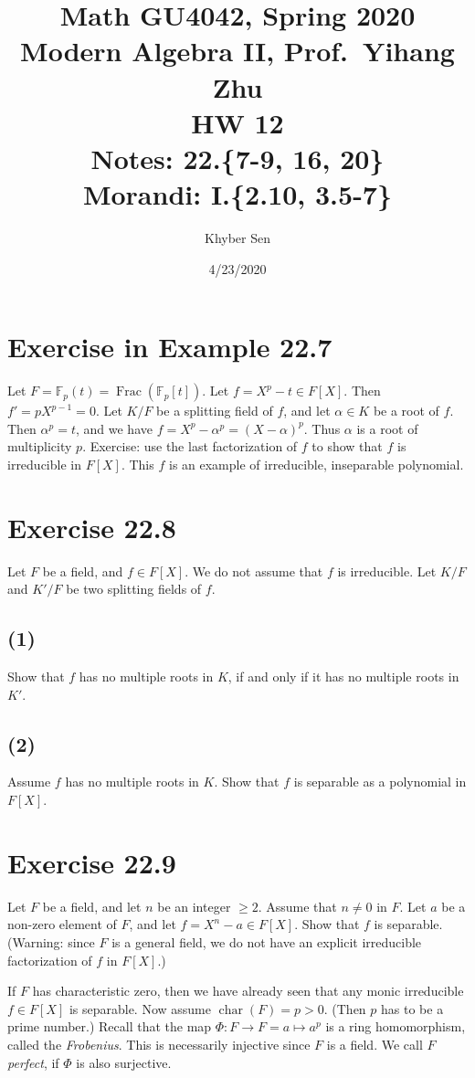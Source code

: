 \documentclass[fleqn]{article}
\title{
Math GU4042, Spring 2020 \\
Modern Algebra II, Prof.\ Yihang Zhu \\
HW 12 \\
Notes: 22.\{7-9, 16, 20\} \\
Morandi: I.\{2.10, 3.5-7\} \\
}
\author{Khyber Sen}
\date{4/23/2020}
\DeclareMathOperator{\Char}{char}
\DeclareMathOperator{\Frac}{Frac}
\begin{document}
    
    \maketitle
    
    \section{Exercise in Example 22.7}
    Let $F = \mathbb{F}_p(t) = \Frac\left(\mathbb{F}_p[t]\right)$.  Let $f = X^p - t \in F[X]$.  Then $f' = pX^{p - 1} = 0$.  Let $K/F$ be a splitting field of $f$, and let $\alpha \in K$ be a root of $f$.  Then $\alpha^p = t$, and we have $f = X^p - \alpha^p = (X - \alpha)^p$.  Thus $\alpha$ is a root of multiplicity $p$.  Exercise: use the last factorization of $f$ to show that $f$ is irreducible in $F[X]$.  This $f$ is an example of irreducible, inseparable polynomial.
    
    \section{Exercise 22.8}
    Let $F$ be a field, and $f \in F[X]$.  We do not assume that $f$ is irreducible.  Let $K/F$ and $K'/F$ be two splitting fields of $f$.
        
        \subsection{(1)}
        Show that $f$ has no multiple roots in $K$, if and only if it has no multiple roots in $K'$.
        
        \subsection{(2)}
        Assume $f$ has no multiple roots in $K$.  Show that $f$ is separable as a polynomial in $F[X]$.
    
    \section{Exercise 22.9}
    Let $F$ be a field, and let $n$ be an integer $\geq 2$.  Assume that $n \neq 0$ in $F$.  Let $a$ be a non-zero element of $F$, and let $f = X^n - a \in F[X]$.  Show that $f$ is separable.  (Warning: since $F$ is a general field, we do not have an explicit irreducible factorization of $f$ in $F[X]$.)
    
    If $F$ has characteristic zero, then we have already seen that any monic irreducible $f \in F[X]$ is separable.  Now assume $\Char(F) = p > 0$.  (Then $p$ has to be a prime number.)  Recall that the map $\Phi: F \to F = a \mapsto a^p$ is a ring homomorphism, called the \textit{Frobenius}.  This is necessarily injective since $F$ is a field.  We call $F$ \textit{perfect}, if $\Phi$ is also surjective.
    
\end{document}
